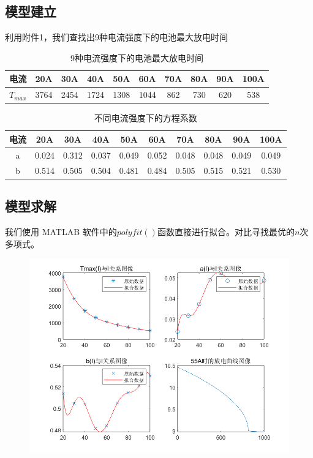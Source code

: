 \documentclass[a4paper]{article}
\begin{document}
\subsection{模型建立}
利用附件1，我们查找出9种电流强度下的电池最大放电时间
\begin{table}[htbp]
    \centering
    \begin{center}
        \begin{tabular}{|c|c|c|c|c|c|c|c|c|c|}
            \hline
            电流        & 20A  & 30A  & 40A  & 50A  & 60A  & 70A & 80A & 90A & 100A \\ \hline
            $T_{max}$ & 3764 & 2454 & 1724 & 1308 & 1044 & 862 & 730 & 620 & 538  \\ \hline
        \end{tabular}
        \caption{9种电流强度下的电池最大放电时间}
        \label{tab:my-table}
    \end{center}
\end{table}
\begin{table}[htbp]
    \centering
    \begin{center}
        \begin{tabular}{|c|c|c|c|c|c|c|c|c|c|}
            \hline
            电流        & 20A  & 30A  & 40A  & 50A  & 60A  & 70A & 80A & 90A & 100A \\ \hline
            a  & 0.024 & 0.312 & 0.037 & 0.049 & 0.052 & 0.048 & 0.048 & 0.049 & 0.049 \\ \hline
            b  & 0.514 & 0.505 & 0.504 & 0.481 & 0.484 & 0.505 & 0.515 & 0.521 & 0.530 \\ \hline    
        \end{tabular}
        \caption{不同电流强度下的方程系数}
        \label{tab:my-table}
    \end{center}
\end{table}

\subsection{模型求解}
我们使用 MATLAB 软件中的$polyfit()$函数直接进行拟合。对比寻找最优的$n$次多项式。
\begin{figure}[htbp]
    \centering
    \includegraphics[width = 1.0\textwidth]{img/4.png}
\end{figure}
\end{document}
